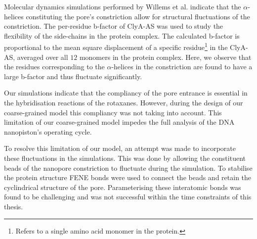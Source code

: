 Molecular dynamics simulations performed by Willems et al.\cite{Willems2020} indicate
that the $\alpha$-helices constituting the pore's constriction allow for structural
fluctuations of the constriction. The per-residue b-factor of ClyA-AS was used to study
the flexibility of the side-chains in the protein complex. The calculated b-factor is
proportional to the mean square displacement of a specific residue\footnote{Refers to a
single amino acid
monomer in the protein.} in the ClyA-AS, averaged over all
$12$ monomers in the protein complex. Here, we observe that the residues corresponding to
the $\alpha$-helices in the constriction are found to have a large b-factor and thus
fluctuate significantly.

Our simulations indicate that the compliancy of the pore
entrance is essential in the hybridisation reactions of the rotaxanes. However, during
the design of our coarse-grained model this compliancy was not taking into account. This
limitation of our coarse-grained model impedes the full analysis of the DNA nanopiston's
operating cycle.

To resolve this limitation of our model, an attempt was made to incorporate these
fluctuations in the simulations. This was done by allowing the constituent beads of the
nanopore constriction to fluctuate during the simulation. To stabilise the protein
structure FENE bonds were used to connect the beads and retain the cyclindrical structure
of the pore. Parameterising these interatomic bonds was found to be challenging and was
not successful within the time constraints of this thesis.


